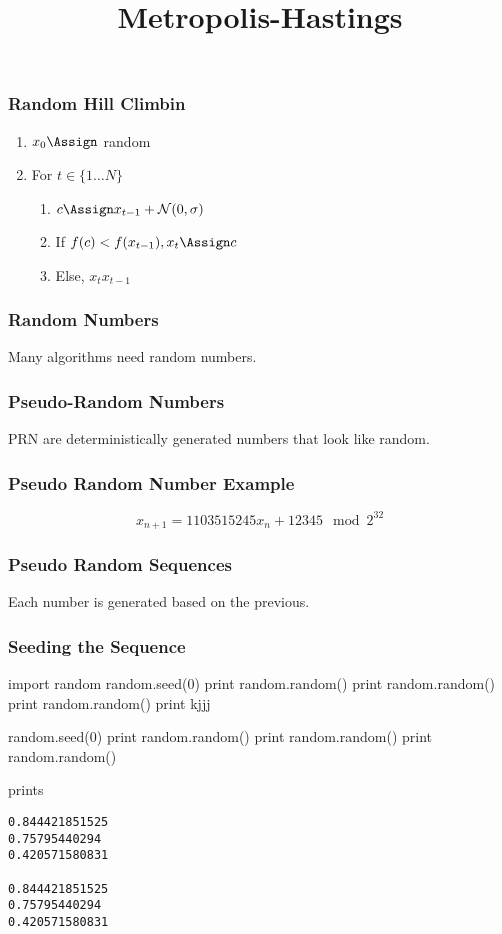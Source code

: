 
\title{Metropolis-Hastings}

\frame{\maketitle}

\begin{frame}[fragile]
\frametitle{Random Hill Climbin}
\begin{enumerate}
\item $x_0 \Assign $ random
\item For $t \in \{1 \ldots N \}$
\begin{enumerate}[a]
\item $c \Assign x_{t-1} + \mathcal{N}(0,\sigma)$
\item If $f(c) < f(x_{t-1}), x_t \Assign c$
\item Else, $x_t x_{t-1}$
\end{enumerate}
\end{enumerate}
\end{frame}

\begin{frame}[fragile]
\frametitle{Random Numbers}
Many algorithms need random numbers.
\end{frame}

\begin{frame}[fragile]
\frametitle{Pseudo-Random Numbers}
PRN are deterministically generated numbers that look like random.
\end{frame}

\begin{frame}[fragile]
\frametitle{Pseudo Random Number Example}

\[
x_{n+1} = 1103515245 x_n + 12345 \mod 2^{32}
\]

\end{frame}

\begin{frame}[fragile]
\frametitle{Pseudo Random Sequences}

Each number is generated based on the previous.

\end{frame}

\begin{frame}[fragile]
\frametitle{Seeding the Sequence}
\begin{python}
import random
random.seed(0)
print random.random()
print random.random()
print random.random()
print kjjj

random.seed(0)
print random.random()
print random.random()
print random.random()
\end{python}
prints
\begin{verbatim}
0.844421851525
0.75795440294
0.420571580831

0.844421851525
0.75795440294
0.420571580831
\end{verbatim}

\end{frame}

